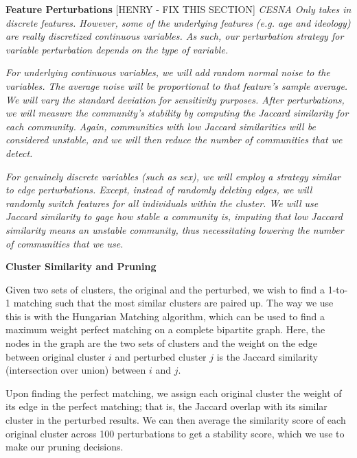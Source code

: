 \textbf{Feature Perturbations}
[HENRY - FIX THIS SECTION]
\textit{CESNA Only takes in discrete features. However, some of the underlying features 
(e.g. age and ideology) are really discretized continuous variables. As such, 
our perturbation strategy for variable perturbation depends on the type of 
variable.}

\textit{For underlying continuous variables, we will add random normal noise to the
variables. The average noise will be proportional to that feature's sample
average. We will vary the standard deviation for sensitivity purposes. After
perturbations, we will measure the community's stability by computing the
Jaccard similarity for each community. Again, communities with low Jaccard
similarities will be considered unstable, and we will then reduce the number of
communities that we detect.}

\textit{For genuinely discrete variables (such as sex), we will employ a strategy
similar to edge perturbations. Except, instead of randomly deleting edges, we
will randomly switch features for all individuals within the cluster. We will
use Jaccard similarity to gage how stable a community is, imputing that low 
Jaccard similarity means an unstable community, thus necessitating lowering 
the number of communities that we use.}

\textbf{Cluster Similarity and Pruning}

Given two sets of clusters, the original and the perturbed, we wish to find a
1-to-1 matching such that the most similar clusters are paired up. The way we
use this is with the Hungarian Matching algorithm, which can be used to find a
maximum weight perfect matching on a complete bipartite graph. Here, the nodes
in the graph are the two sets of clusters and the weight on the edge between
original cluster $i$ and perturbed cluster $j$ is the Jaccard similarity
(intersection over union) between $i$ and $j$.

Upon finding the perfect matching, we assign each original cluster the weight of
its edge in the perfect matching; that is, the Jaccard overlap with its similar
cluster in the perturbed results. We can then average the similarity score of
each original cluster across 100 perturbations to get a stability score, which
we use to make our pruning decisions.
